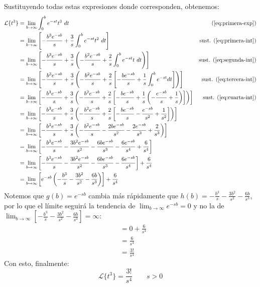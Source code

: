 \documentclass[12pt, a4paper]{article}
\begin{document}
Sustituyendo todas estas expresiones donde corresponden, obtenemos:
\begin{align*}
    \mathcal{L}\{t^3\} &= \lim_{b\to\infty}\int_0^b e^{-st}t^3\ dt & (\ref{eq:primera-exp}) \\
	&=\lim_{b\to\infty} \left[ -\frac{b^3e^{-sb}}{s}+\frac{3}{s}\int_0^b e^{-st}t^2\ dt \right] & \text{sust. } (\ref{eq:primera-int}) \\
    &=\lim_{b\to\infty} \left[ -\frac{b^3e^{-sb}}{s}+\frac{3}{s}\left(-\frac{b^2e^{-sb}}{s}+\frac{2}{s}\int_0^b e^{-st}t\ dt\right) \right] & \text{sust. } (\ref{eq:segunda-int}) \\
    &=\lim_{b\to\infty} \left[ -\frac{b^3e^{-sb}}{s}+\frac{3}{s}\left(-\frac{b^2e^{-sb}}{s}+\frac{2}{s}\left[-\frac{be^{-sb}}{s}+\frac{1}{s}\int_0^b e^{-st}dt\right]\right) \right] & \text{sust. } (\ref{eq:tercera-int}) \\
    &=\lim_{b\to\infty} \left[ -\frac{b^3e^{-sb}}{s}+\frac{3}{s}\left(-\frac{b^2e^{-sb}}{s}+\frac{2}{s}\left[-\frac{be^{-sb}}{s}+\frac{1}{s}\left(-\frac{e^{-sb}}{s}+\frac{1}{s}\right)\right]\right) \right] & \text{sust. } (\ref{eq:cuarta-int}) \\
    &=\lim_{b\to\infty} \left[ -\frac{b^3e^{-sb}}{s}+\frac{3}{s}\left(-\frac{b^2e^{-sb}}{s}+\frac{2}{s}\left[-\frac{be^{-sb}}{s}-\frac{e^{-sb}}{s^2}+\frac{1}{s^2}\right]\right) \right] \\
    &=\lim_{b\to\infty} \left[ -\frac{b^3e^{-sb}}{s}+\frac{3}{s}\left(-\frac{b^2e^{-sb}}{s}-\frac{2be^{-sb}}{s^2}-\frac{2e^{-sb}}{s^3}+\frac{2}{s^3}\right) \right] \\
    &=\lim_{b\to\infty} \left[ -\frac{b^3e^{-sb}}{s}-\frac{3b^2e^{-sb}}{s^2}-\frac{6be^{-sb}}{s^3}-\frac{6e^{-sb}}{s^4}+\frac{6}{s^4} \right] \\
    &=\lim_{b\to\infty} \left[ -\frac{b^3e^{-sb}}{s}-\frac{3b^2e^{-sb}}{s^2}-\frac{6be^{-sb}}{s^3}-\frac{6e^{-sb}}{s^4} \right] + \frac{6}{s^4} \\
    &=\lim_{b\to\infty} \left[ e^{-sb} \left( -\frac{b^3}{s}-\frac{3b^2}{s^2}-\frac{6b}{s^3} \right) \right] + \frac{6}{s^4}
\end{align*}
Notemos que \(g(b) = e^{-sb}\) cambia más rápidamente que \(h(b) = -\frac{b^3}{s}-\frac{3b^2}{s^2}-\frac{6b}{s^3}\), por lo que el límite seguirá la tendencia de \(\lim_{b \to \infty} e^{-sb} = 0\) y no la de \(\lim_{b \to \infty} \left[ -\frac{b^3}{s}-\frac{3b^2}{s^2}-\frac{6b}{s^3} \right] = \infty \):
\begin{align*}
	&= 0 + \frac{6}{s^{4}} \\
    &=\frac{6}{s^4} \\
	&=\frac{3!}{s^4}
\end{align*}
Con esto, finalmente:
\[
\mathcal{L}\{t^3\}=\frac{3!}{s^4} \qquad s > 0
\]
\end{document}
